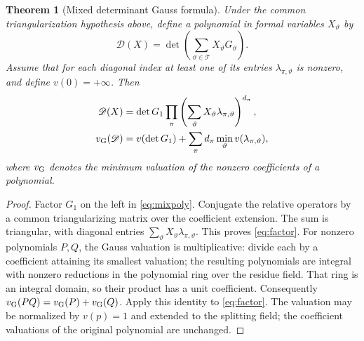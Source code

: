 \documentclass[11pt,a4paper]{article}
\newtheorem{theorem}{Theorem}[section]\newtheorem{proposition}[theorem]{Proposition}\newtheorem{lemma}[theorem]{Lemma}\newtheorem{corollary}[theorem]{Corollary}\theoremstyle{definition}\newtheorem{definition}[theorem]{Definition}\newtheorem{remark}[theorem]{Remark}\newtheorem{obligation}[theorem]{Obligation}
\begin{document}
\begin{theorem}[Mixed determinant Gauss formula]\label{thm:gauss}
Under the common triangularization hypothesis above, define a polynomial in formal variables $X_\vartheta$ by
\begin{equation}\label{eq:mixpoly}
\mathscr D(X)=\det\left(\sum_{\vartheta\in\mathcal T}X_\vartheta G_\vartheta\right).
\end{equation}
Assume that for each diagonal index at least one of its entries $\lambda_{\pi,\vartheta}$ is nonzero, and define $v(0)=+\infty$. Then
\begin{align}
\mathscr D(X)&=\det G_1\prod_\pi\left(\sum_\vartheta X_\vartheta\lambda_{\pi,\vartheta}\right)^{d_\pi},\label{eq:factor}\\
v_{\mathrm G}(\mathscr D)&=v(\det G_1)+\sum_\pi d_\pi\min_\vartheta v(\lambda_{\pi,\vartheta}),\label{eq:gauss}
\end{align}
where $v_{\mathrm G}$ denotes the minimum valuation of the nonzero coefficients of a polynomial.
\end{theorem}
\begin{proof}
Factor $G_1$ on the left in \eqref{eq:mixpoly}. Conjugate the relative operators by a common triangularizing matrix over the coefficient extension. The sum is triangular, with diagonal entries $\sum_\vartheta X_\vartheta\lambda_{\pi,\vartheta}$. This proves \eqref{eq:factor}. For nonzero polynomials $P,Q$, the Gauss valuation is multiplicative: divide each by a coefficient attaining its smallest valuation; the resulting polynomials are integral with nonzero reductions in the polynomial ring over the residue field. That ring is an integral domain, so their product has a unit coefficient. Consequently $v_{\mathrm G}(PQ)=v_{\mathrm G}(P)+v_{\mathrm G}(Q)$. Apply this identity to \eqref{eq:factor}. The valuation may be normalized by $v(p)=1$ and extended to the splitting field; the coefficient valuations of the original polynomial are unchanged.\end{proof}
\end{document}
